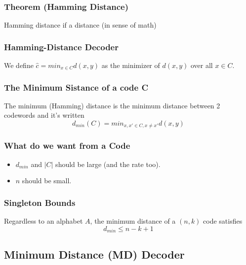 \documentclass{article}
\begin{document}
\subsubsection{Theorem (Hamming Distance)}
Hamming distance if a distance (in sense of math)

\subsubsection{Hamming-Distance Decoder}
\begin{tcolorbox}[sharp corners, colback=green!30, colframe=green!80!blue, title=Hamming-Distance Decoder]
We define $ \hat{c} = min_{x \in C} d(x,y) $ as the minimizer of $ d(x,y) $ over all $ x \in C $.
\end{tcolorbox}

\subsubsection{The Minimum Sistance of a code C}
The minimum (Hamming) distance is the minimum distance between 2 codewords and it's written
\begin{equation}
 d_{min}(C) = min_{x,x' \in C, x \neq x'} d(x,y)
\end{equation}

\subsubsection{What do we want from a Code}
\begin{tcolorbox}[width=12.1cm, leftrule=3mm]
\begin{itemize}
\item $ d_{min} $ and $ |C| $ should be large (and the rate too).
\item $ n $ should be small.
\end{itemize}
\end{tcolorbox}

\subsubsection{Singleton Bounds}
Regardless to an alphabet $ A $, the minimum distance of a $ (n,k) $ code satisfies
\begin{equation}
d_{min} \leq n - k + 1
\end{equation}

\subsection{Minimum Distance (MD) Decoder}
\end{document}
